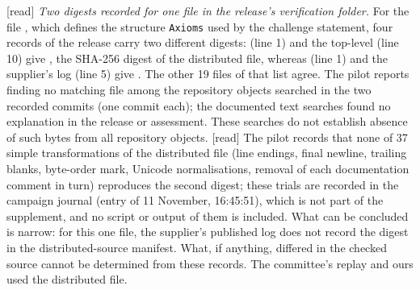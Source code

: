 \documentclass[11pt,a4paper]{article}
\theoremstyle{plain}
\theoremstyle{definition}
\theoremstyle{remark}
\numberwithin{equation}{section}
\newcommand{\st}[1]{\textsf{[#1]}}
\begin{document}
\st{read} \emph{Two digests recorded for one file in the release's verification folder.} For the file
, which defines the structure \texttt{Axioms} used by the challenge statement, four records of the release carry two different digests:  (line 1) and the top-level
 (line 10) give , the SHA-256 digest of the distributed file, whereas
 (line 1) and the supplier's log  (line 5) give
. The other 19 files of that list agree. The pilot reports finding no matching file among the repository objects searched in the two recorded commits (one commit each); the documented text searches found no explanation in the release or assessment.
These searches do not establish absence of such bytes from all repository objects.
\st{read} The pilot records that none of 37 simple transformations of the distributed file (line endings, final newline,
trailing blanks, byte-order mark, Unicode normalisations, removal of each documentation comment in turn) reproduces
the second digest; these trials are recorded in the campaign journal (entry of 11 November, 16:45:51), which is not part of the supplement, and no script or output of them is included. What can be concluded is narrow: for this one file, the supplier's published log does not
record the digest in the distributed-source manifest. What, if anything, differed in the checked source cannot be determined from these records. The committee's replay
and ours used the distributed file.
\end{document}
